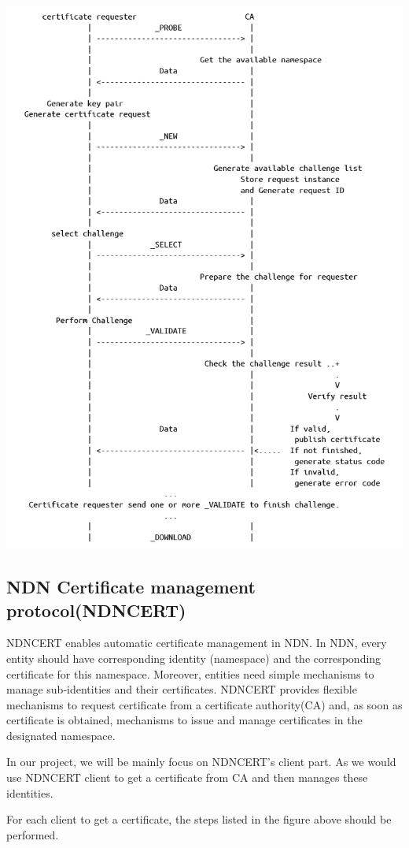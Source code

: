 \documentclass[a0,portrait]{poster}
\begin{document}
\begin{multicols}{2}
\begin{minipage}[b]{0.45\linewidth}
	\includegraphics[width=\linewidth]{figures/protocol.png}
\end{minipage}

\subsection*{NDN Certificate management protocol(NDNCERT)\cite{zhang2017ndncert}}
\par
	NDNCERT enables automatic certificate management in NDN. 
	In NDN, every entity should have corresponding identity (namespace) and the corresponding certificate for this namespace. 
	Moreover, entities need simple mechanisms to manage sub-identities and their certificates. 
	NDNCERT provides flexible mechanisms to request certificate from a certificate authority(CA) and, as soon as certificate is obtained, mechanisms to issue and manage certificates in the designated namespace.
\par
	In our project, we will be mainly focus on NDNCERT's client part. 
	As we would use NDNCERT client to get a certificate from CA and then manages these identities.
\par
	For each client to get a certificate, the steps listed in the figure above should be performed.


\end{multicols}
\end{document}
